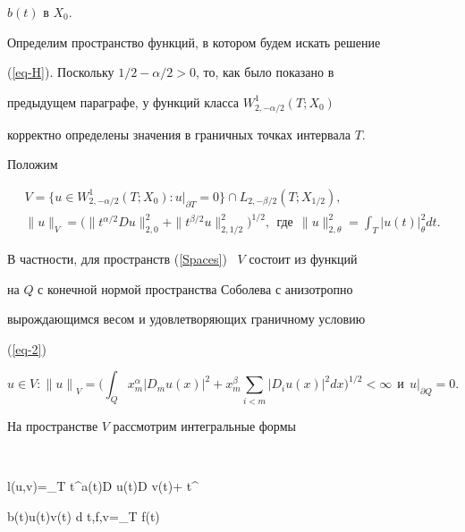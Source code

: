 $b(t)$ в $X_0$.





Определим пространство функций, в котором будем искать решение


(\ref{eq-H}). Поскольку $1/2-\alpha/2>0$, то, как было показано в


предыдущем параграфе, у функций класса $W_{2,-\alpha/2}^1(T;X_0)$


корректно определены значения в граничных точках интервала $T$.


Положим


\begin{gather*}


V=\{u \in W_{2,-\alpha/2}^1(T;X_0): u|_{\partial T}=0\} \cap


L_{2,-\beta/2}(T;X_{1/2}), \\


\|u\|_V=\big( \|t^{\alpha/2} D u \|_{2,0}^2+


\|t^{\beta/2} u \|_{2,1/2}^2 \big)^{1/2}, \ \ \text{где}


\ \ \| u \|_{2,\theta}^2=\int_T {|u(t)|}_\theta^2 d t.


\end{gather*}


В частности, для пространств (\ref{Spaces}) \ $V$ состоит из функций


на $Q$ с конечной нормой пространства Соболева с анизотропно


вырождающимся весом и удовлетворяющих граничному условию


(\ref{eq-2})


\begin{equation}\label{Sobol}


u \in V: {\|u\|}_V=


\bigg(\int_Q x_m^\alpha|D_m u(x)|^2 +


x_m^\beta\sum\limits_{i<m}|D_{i} u(x)|^2 d x


\bigg)^{1/2}< \infty \ \ \text{и} \ \ u|_{\partial Q} =0.


\end{equation}





На пространстве $V$ рассмотрим интегральные формы


$$


l(u,v)=\int_T t^\alpha a(t)D u(t)\cdot D v(t)+ t^\beta


b(t)u(t)\cdot v(t) d t,\quad \la f,v\ra=\int_T f(t)\cdot


